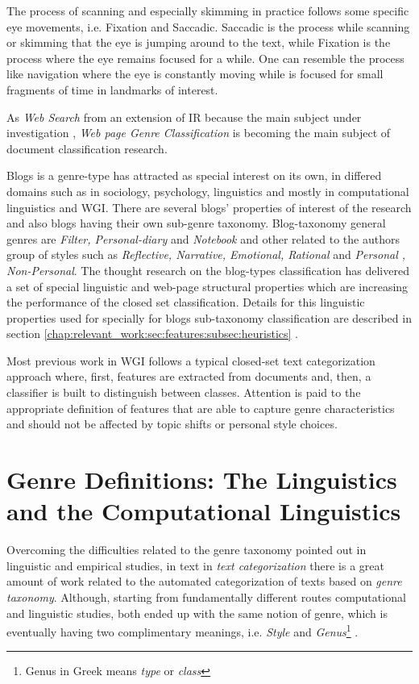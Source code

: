 The process of scanning and especially skimming in practice follows some specific eye movements, i.e. Fixation and Saccadic. Saccadic is the process while scanning or skimming that the eye is jumping around to the text, while Fixation is the process where the eye remains focused for a while. One can resemble the process like navigation where the eye is constantly moving while is focused for small fragments of time in landmarks of interest.
  
As \textit{Web Search} from an extension of IR because the main subject under investigation \parencite{manning2008introduction}, \textit{Web page Genre Classification } is becoming the main subject of document classification research.

Blogs is a genre-type has attracted as special interest on its own, in differed domains such as in sociology, psychology, linguistics and mostly in computational linguistics and WGI. There are several blogs' properties of interest of the research and  also blogs having their own sub-genre taxonomy. Blog-taxonomy general genres are \textit{Filter, Personal-diary} and \textit{Notebook} and other related to the authors group of styles such as \textit{Reflective, Narrative, Emotional, Rational} and \textit{Personal , Non-Personal}. The thought research on the blog-types classification has delivered a set of special linguistic and web-page structural properties which are increasing the performance of the closed set classification. Details for this linguistic properties used for specially for blogs sub-taxonomy classification are described in section \ref{chap:relevant_work:sec:features:subsec:heuristics} \cite{virik2017blog,hoffmann2012cohesive,hoffmann2012cohesive,derczynski2014social,qu2006automated}. 

Most previous work in WGI follows a typical closed-set text categorization approach where, first, features are extracted from documents and, then, a classifier is built to distinguish between classes. Attention is paid to the appropriate definition of features that are able to capture genre characteristics and should not be affected by topic shifts or personal style choices. 

\section{Genre Definitions: The Linguistics and the Computational Linguistics}\label{chap:relevant_work:sec:definitions}

Overcoming the difficulties related to the genre taxonomy pointed out in linguistic and empirical studies, in text in \textit{text categorization} there is a great amount of work related to the automated categorization of texts based on \textit{genre taxonomy}. Although, starting from fundamentally different routes computational and linguistic studies, both ended up with the same notion of genre, which is eventually having two complimentary meanings,  i.e. \textit{Style} and \textit{Genus}\footnote{Genus in Greek means \textit{type} or \textit{class}} \parencite{sugiyanto2014term}. 


